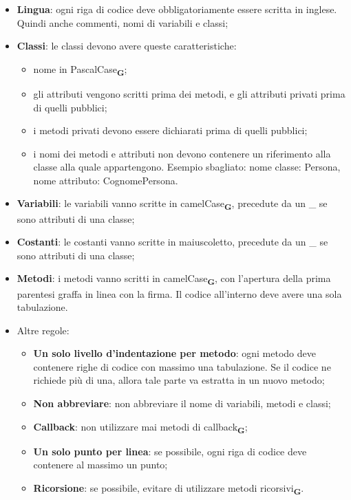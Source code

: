 \begin{itemize}
    \item \textbf{Lingua}: ogni riga di codice deve obbligatoriamente essere scritta in inglese. Quindi anche commenti, nomi di variabili e classi;
    \item \textbf{Classi}: le classi devono avere queste caratteristiche:
          \begin{itemize}
              \item nome in PascalCase\textsubscript{\textbf{G}};
              \item gli attributi vengono scritti prima dei metodi, e gli attributi privati prima di quelli pubblici;
              \item i metodi privati devono essere dichiarati prima di quelli pubblici;
              \item i nomi dei metodi e attributi non devono contenere un riferimento alla classe alla quale appartengono. Esempio sbagliato: nome classe: Persona, nome attributo: CognomePersona.
          \end{itemize}
    \item \textbf{Variabili}: le variabili vanno scritte in camelCase\textsubscript{\textbf{G}}, precedute da un \_ se sono attributi di una classe;
    \item \textbf{Costanti}: le costanti vanno scritte in maiuscoletto, precedute da un \_ se sono attributi di una classe;
    \item \textbf{Metodi}: i metodi vanno scritti in camelCase\textsubscript{\textbf{G}}, con l'apertura della prima parentesi graffa in linea con la firma. Il codice all'interno deve avere una sola tabulazione.
    \item Altre regole:
          \begin{itemize}
              \item \textbf{Un solo livello d'indentazione per metodo}: ogni metodo deve contenere righe di codice con massimo una tabulazione. Se il codice ne richiede più di una, allora tale parte va estratta in un nuovo metodo;
              \item \textbf{Non abbreviare}: non abbreviare il nome di variabili, metodi e classi;
              \item \textbf{Callback}: non utilizzare mai metodi di callback\textsubscript{\textbf{G}};
              \item \textbf{Un solo punto per linea}: se possibile, ogni riga di codice deve contenere al massimo un punto;
              \item \textbf{Ricorsione}: se possibile, evitare di utilizzare metodi ricorsivi\textsubscript{\textbf{G}}.
          \end{itemize}
\end{itemize}
